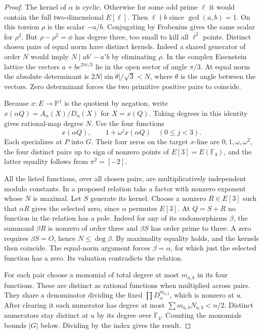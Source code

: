 \documentclass[11pt]{article}
\begin{document}
\begin{proof}
The kernel of \(\alpha\) is cyclic. Otherwise for some odd prime
\(\ell\) it would contain the full two-dimensional \(E[\ell]\).
Then \(\ell\nmid b\) since \(\gcd(a,b)=1\). On this torsion \(\rho\)
is the scalar \(-a/b\). Conjugating by Frobenius gives the same
scalar for \(\rho^2\). But \(\rho-\rho^2=\phi\) has degree three,
too small to kill all \(\ell^2\) points. Distinct chosen pairs of
equal norm have distinct kernels. Indeed a shared generator of
order \(N\) would imply \(N\mid ab'-a'b\) by eliminating \(\rho\).
In the complex Eisenstein lattice the vectors \(a+b e^{2\pi i/3}\)
lie in the open sector of angle \(\pi/3\). At equal norm the absolute
determinant is \(2N|\sin\theta|/\sqrt3<N\), where \(\theta\) is the
angle between the vectors. Zero determinant forces the two primitive
positive pairs to coincide.

Because \(x:E\to\mathbb P^1\) is the quotient by negation, write
\(x(\alpha Q)=A_\alpha(X)/D_\alpha(X)\) for \(X=x(Q)\).
Taking degrees in this identity gives rational-map degree \(N\).
Use the four functions
\[
   x(\alpha Q),\qquad 1+\omega^j x(\alpha Q)\quad(0\le j<3).
\]
Each specializes at \(P\) into \(G\). Their four zeros on the
target \(x\)-line are \(0,1,\omega,\omega^2\), the four distinct
pairs up to sign of nonzero points of \(E[3]=E(\mathbb F_4)\), and
the latter equality follows from \(\pi^2=[-2]\).

All the listed functions, over all chosen pairs, are multiplicatively
independent modulo constants. In a proposed relation take a factor
with nonzero exponent whose \(N\) is maximal. Let \(S\) generate its
kernel. Choose a nonzero \(R\in E[3]\) such that \(\alpha R\) gives
the selected zero, since \(\alpha\) permutes \(E[3]\). At \(Q=S+R\)
no function in the relation has a pole. Indeed for any of its
endomorphisms \(\beta\), the summand \(\beta R\) is nonzero of order
three and \(\beta S\) has order prime to three. A zero requires
\(\beta S=O\), hence \(N\le\deg\beta\). By maximality equality
holds, and the kernels then coincide. The equal-norm argument forces
\(\beta=\alpha\), for which just the selected function has a zero.
Its valuation contradicts the relation.

For each pair choose a monomial of total degree at most \(m_{a,b}\)
in its four functions. These are distinct as rational functions when
multiplied across pairs. They share a denominator dividing the fixed
\(\prod D_\alpha^{m_{a,b}}\), which is nonzero at \(u\).
After clearing it each numerator has degree at most
\(\sum m_{a,b}N_{a,b}<n/2\). Distinct numerators stay distinct at
\(u\) by its degree over \(\mathbb F_4\). Counting the monomials bounds \(|G|\) below. Dividing by the index gives the result.
\end{proof}
\end{document}

